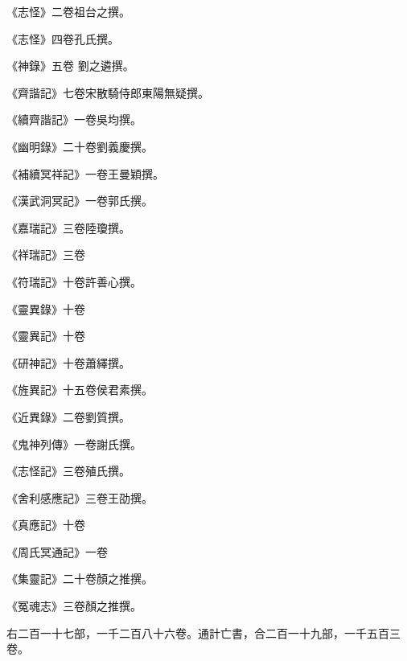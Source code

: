 \begin{pinyinscope}
 《志怪》二卷祖台之撰。



 《志怪》四卷孔氏撰。



 《神錄》五卷
 劉之遴撰。



 《齊諧記》七卷宋散騎侍郎東陽無疑撰。



 《續齊諧記》一卷吳均撰。



 《幽明錄》二十卷劉義慶撰。



 《補續冥祥記》一卷王曼穎撰。



 《漢武洞冥記》一卷郭氏撰。



 《嘉瑞記》三卷陸瓊撰。



 《祥瑞記》三卷



 《符瑞記》十卷許善心撰。



 《靈異錄》十卷



 《靈異記》十卷



 《研神記》十卷蕭繹撰。



 《旌異記》十五卷侯君素撰。



 《近異錄》二卷劉質撰。



 《鬼神列傳》一卷謝氏撰。



 《志怪記》三卷殖氏撰。



 《舍利感應記》三卷王劭撰。



 《真應記》十卷



 《周氏冥通記》一卷



 《集靈記》二十卷顏之推撰。



 《冤魂志》三卷顏之推撰。



 右二百一十七部，一千二百八十六卷。通計亡書，合二百一十九部，一千五百三卷。




\end{pinyinscope}

